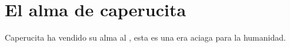 \chapter{El alma de caperucita}
Caperucita ha vendido su alma al , esta es una era aciaga para la humanidad.
